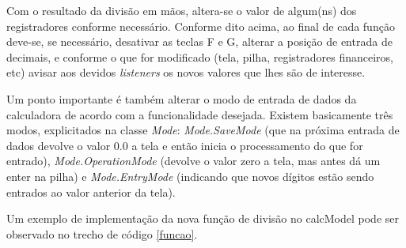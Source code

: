 Com o resultado da divisão em mãos, altera-se o valor de algum(ns) dos registradores conforme necessário. Conforme dito acima, ao final de cada função deve-se, se necessário, desativar as teclas F e G, alterar a posição de entrada de decimais, e conforme o que for modificado (tela, pilha, registradores financeiros, etc) avisar aos devidos \textit{listeners} os novos valores que lhes são de interesse. 

Um ponto importante é também alterar o modo de entrada de dados da calculadora de acordo com a funcionalidade desejada. Existem basicamente três modos, explicitados na classe \textit{Mode}: \textit{Mode.SaveMode} (que na próxima entrada de dados devolve o valor 0.0 a tela e então inicia o processamento do que for entrado), \textit{Mode.OperationMode} (devolve o valor zero a tela, mas antes dá um enter na pilha) e \textit{Mode.EntryMode} (indicando que novos dígitos estão sendo entrados ao valor anterior da tela). 

Um exemplo de implementação da nova função de divisão no calcModel pode ser observado no trecho de código \ref{funcao}.




% 
%         
%         
%                  
